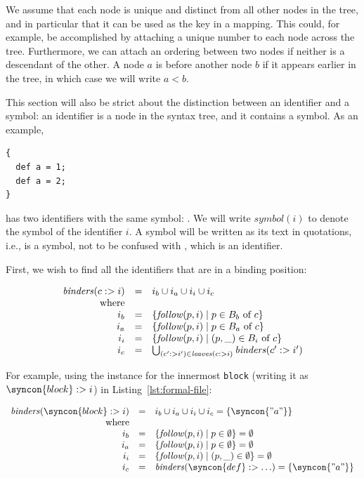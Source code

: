 \documentclass{kththesis}
\begin{document}
We assume that each node is unique and distinct from all other nodes in the tree, and in particular that it can be used as the key in a mapping. This could, for example, be accomplished by attaching a unique number to each node across the tree. Furthermore, we can attach an ordering between two nodes if neither is a descendant of the other. A node $a$ is before another node $b$ if it appears earlier in the tree, in which case we will write $a < b$.


This section will also be strict about the distinction between an identifier and a symbol: an identifier is a node in the syntax tree, and it contains a symbol. As an example,

\begin{verbatim}
{
  def a = 1;
  def a = 2;
}
\end{verbatim}

\newcommand{\sym}{\ensuremath{\mathit{symbol}}}
\newcommand{\symlit}[1]{\text{''#1''}}

has two identifiers with the same symbol: \symlit{a}. We will write $\sym(i)$ to denote the symbol of the identifier $i$. A symbol will be written as its text in quotations, i.e., \symlit{a} is a symbol, not to be confused with , which is an identifier.

First, we wish to find all the identifiers that are in a binding position:

\newcommand{\binders}{\ensuremath{\mathit{binders}}}

$$
\begin{array}{rcl}
\binders(c :> i) & = & i_b \cup i_a \cup i_i \cup i_c \\
\text{where} & & \\
i_b & = & \{ \follow(p, i) \mid p \in B_b \text{ of } c\} \\
i_a & = & \{ \follow(p, i) \mid p \in B_a \text{ of } c\} \\
i_i & = & \{ \follow(p, i) \mid (p, \_) \in B_i \text{ of } c\} \\
i_c & = & \bigcup_{(c' :> i') \in \leaves(c :> i)} \binders(c' :> i') \\
\end{array}
$$

For example, using the instance for the innermost \texttt{block} (writing it as $\syncon{block} :> i$) in Listing~\ref{lst:formal-file}:

$$
\begin{array}{rcl}
\binders(\syncon{block} :> i) & = & i_b \cup i_a \cup i_i \cup i_c = \{\syncon{"a"}\}\\
\text{where} & & \\
i_b & = & \{ \follow(p, i) \mid p \in \emptyset \} = \emptyset \\
i_a & = & \{ \follow(p, i) \mid p \in \emptyset \} = \emptyset \\
i_i & = & \{ \follow(p, i) \mid (p, \_) \in \emptyset \} = \emptyset \\
i_c & = & \binders(\syncon{def} :> \ldots) = \{\syncon{"a"}\} \\
\end{array}
$$
\end{document}

